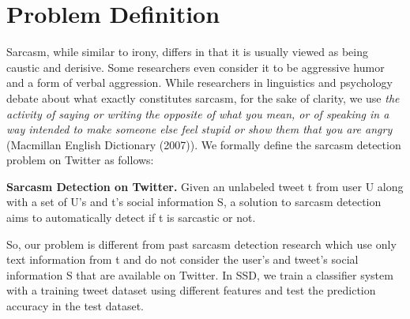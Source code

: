 \section{Problem Definition}
\label{sec:problem}
Sarcasm, while similar to irony, differs in that it is usually viewed as being caustic and derisive. Some researchers even
consider it to be aggressive humor and a form of verbal aggression. While researchers in linguistics and psychology debate about what exactly constitutes sarcasm, for the
sake of clarity, we use \textit{the activity of saying or writing the opposite of what you mean, or of speaking in a way intended to make someone
else feel stupid or show them that you are angry} (Macmillan English Dictionary (2007)). We formally define the sarcasm detection problem on Twitter as follows:
\begin{mydef}
\textbf{Sarcasm Detection on Twitter.} Given an
unlabeled tweet t from user U along with a set of U’s and t's social information S, a solution to sarcasm detection aims to automatically detect if t is sarcastic or not.
\end{mydef}
So, our problem is different from past sarcasm detection research
which use only text information from t and do not consider
the user's and tweet's social information S that are available on Twitter. In SSD, we train a classifier system with a training tweet dataset using different features and test the prediction accuracy in the test dataset.